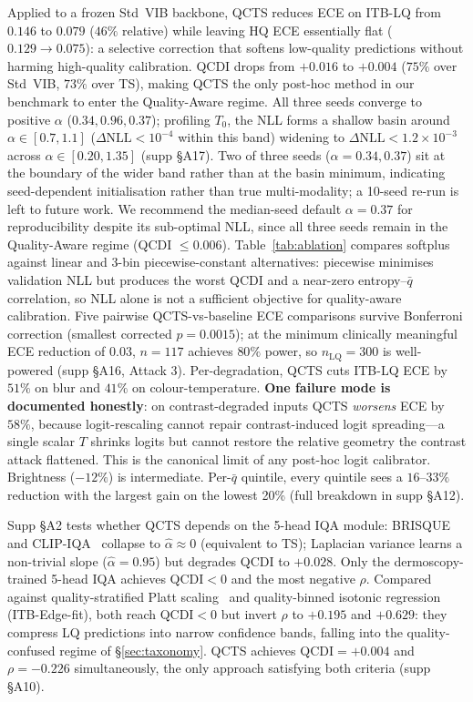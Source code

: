 \documentclass{bmvc2k}
\newcommand{\qbar}{\bar{q}}
\begin{document}
Applied to a frozen Std~VIB backbone, QCTS reduces ECE on ITB-LQ from $0.146$ to $0.079$ ($46\%$ relative) while leaving HQ ECE essentially flat ($0.129\to0.075$): a selective correction that softens low-quality predictions without harming high-quality calibration. QCDI drops from $+0.016$ to $+0.004$ ($75\%$ over Std~VIB, $73\%$ over TS), making QCTS the only post-hoc method in our benchmark to enter the Quality-Aware regime. All three seeds converge to positive $\alpha$ ($0.34, 0.96, 0.37$); profiling $T_0$, the NLL forms a shallow basin around $\alpha\in[0.7,1.1]$ ($\Delta\text{NLL}{<}10^{-4}$ within this band) widening to $\Delta\text{NLL}{<}1.2{\times}10^{-3}$ across $\alpha\in[0.20,1.35]$ (supp \S A17). Two of three seeds ($\alpha{=}0.34,0.37$) sit at the boundary of the wider band rather than at the basin minimum, indicating seed-dependent initialisation rather than true multi-modality; a 10-seed re-run is left to future work. We recommend the median-seed default $\alpha{=}0.37$ for reproducibility despite its sub-optimal NLL, since all three seeds remain in the Quality-Aware regime (QCDI ${\le}0.006$). Table~\ref{tab:ablation} compares softplus against linear and 3-bin piecewise-constant alternatives: piecewise minimises validation NLL but produces the worst QCDI and a near-zero entropy--$\qbar$ correlation, so NLL alone is not a sufficient objective for quality-aware calibration. Five pairwise QCTS-vs-baseline ECE comparisons survive Bonferroni correction (smallest corrected $p{=}0.0015$); at the minimum clinically meaningful ECE reduction of $0.03$, $n{=}117$ achieves $80\%$ power, so $n_\text{LQ}{=}300$ is well-powered (supp \S A16, Attack 3). Per-degradation, QCTS cuts ITB-LQ ECE by $51\%$ on blur and $41\%$ on colour-temperature. \textbf{One failure mode is documented honestly}: on contrast-degraded inputs QCTS \emph{worsens} ECE by $58\%$, because logit-rescaling cannot repair contrast-induced logit spreading---a single scalar $T$ shrinks logits but cannot restore the relative geometry the contrast attack flattened. This is the canonical limit of any post-hoc logit calibrator. Brightness ($-12\%$) is intermediate. Per-$\bar q$ quintile, every quintile sees a $16$--$33\%$ reduction with the largest gain on the lowest 20\% (full breakdown in supp \S A12).



Supp \S A2 tests whether QCTS depends on the 5-head IQA module: BRISQUE~\cite{brisque} and CLIP-IQA~\cite{clipiqa} collapse to $\hat\alpha\approx0$ (equivalent to TS); Laplacian variance learns a non-trivial slope ($\hat\alpha{=}0.95$) but degrades QCDI to $+0.028$. Only the dermoscopy-trained 5-head IQA achieves QCDI${<}0$ and the most negative $\rho$. Compared against quality-stratified Platt scaling~\cite{platt1999probabilistic} and quality-binned isotonic regression (ITB-Edge-fit), both reach QCDI${<}0$ but invert $\rho$ to $+0.195$ and $+0.629$: they compress LQ predictions into narrow confidence bands, falling into the quality-confused regime of \S\ref{sec:taxonomy}. QCTS achieves QCDI${=}{+}0.004$ and $\rho{=}{-}0.226$ simultaneously, the only approach satisfying both criteria (supp \S A10).
\end{document}
